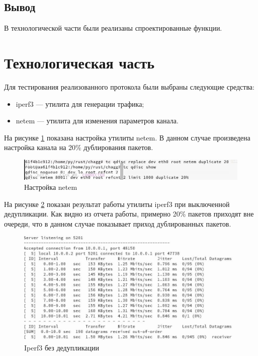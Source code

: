 \documentclass[14pt, a4paper]{extarticle}
\begin{document}
\subsection{Вывод}
В технологической части были реализаны спроектированные функции.

\clearpage
\section{Технологическая часть}
Для тестирования реализованного протокола были выбраны следующие средства:
\begin{itemize}
	\item iperf3 --- утилита для генерации трафика\cite{iperf3};
	\item netem --- утилита для изменения параметров канала\cite{netem}.
\end{itemize}

На рисунке \ref{setnetem} показана настройка утилиты netem. В данном случае произведена настройка канала на 20\% дублирования пакетов.
\begin{figure}[H]
	\centering
	\includegraphics[scale=0.7]{setnetem.jpg}
	\caption{Настройка netem}
	\label{setnetem}
\end{figure}

На рисунке \ref{resoff} показан результат работы утилиты iperf3 при выключенной дедупликации. Как видно из отчета работы, примерно 20\% пакетов приходят вне очереди, что в данном случае показывает приход дублированных пакетов.
\begin{figure}[H]
	\centering
	\includegraphics[scale=0.7]{resoff.jpg}
	\caption{Iperf3 без дедупликации}
	\label{resoff}
\end{figure}
\end{document}
